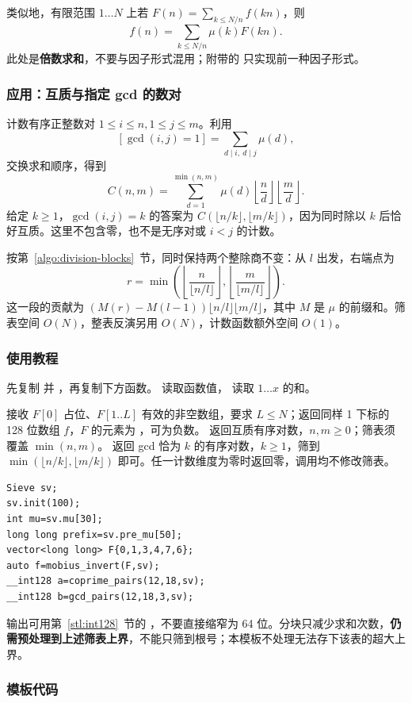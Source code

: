 类似地，有限范围 $1\ldots N$ 上若 $F(n)=\sum_{k\leq N/n}f(kn)$，则
\[
    f(n)=\sum_{k\leq N/n}\mu(k)F(kn).
\]
此处是\textbf{倍数求和}，不要与因子形式混用；附带的  只实现前一种因子形式。

\subsubsection*{应用：互质与指定 gcd 的数对}
计数有序正整数对 $1\leq i\leq n,1\leq j\leq m$。利用
\[
    [\gcd(i,j)=1]=\sum_{d\mid i,\ d\mid j}\mu(d),
\]
交换求和顺序，得到
\[
    C(n,m)=\sum_{d=1}^{\min(n,m)}\mu(d)
    \left\lfloor\frac nd\right\rfloor\left\lfloor\frac md\right\rfloor.
\]
给定 $k\geq1$，$\gcd(i,j)=k$ 的答案为 $C(\lfloor n/k\rfloor,\lfloor m/k\rfloor)$，因为同时除以 $k$ 后恰好互质。这里不包含零，也不是无序对或 $i<j$ 的计数。

按第~\ref{algo:division-blocks}~节，同时保持两个整除商不变：从 $l$ 出发，右端点为
\[
    r=\min\left(\left\lfloor\frac{n}{\lfloor n/l\rfloor}\right\rfloor,
                \left\lfloor\frac{m}{\lfloor m/l\rfloor}\right\rfloor\right).
\]
这一段的贡献为 $(M(r)-M(l-1))\lfloor n/l\rfloor\lfloor m/l\rfloor$，其中 $M$ 是 $\mu$ 的前缀和。筛表空间 $O(N)$，整表反演另用 $O(N)$，计数函数额外空间 $O(1)$。

\subsubsection*{使用教程}
先复制  并 ，再复制下方函数。 读取函数值， 读取 $1\ldots x$ 的和。

 接收 $F[0]$ 占位、$F[1..L]$ 有效的非空数组，要求 $L\leq N$；返回同样 1 下标的 128 位数组 $f$，$F$ 的元素为 ，可为负数。 返回互质有序对数，$n,m\geq0$；筛表须覆盖 $\min(n,m)$。 返回 gcd 恰为 $k$ 的有序对数，$k\geq1$，筛到 $\min(\lfloor n/k\rfloor,\lfloor m/k\rfloor)$ 即可。任一计数维度为零时返回零，调用均不修改筛表。
\begin{lstlisting}[style=mtycpp,numbers=none]
Sieve sv;
sv.init(100);
int mu=sv.mu[30];
long long prefix=sv.pre_mu[50];
vector<long long> F{0,1,3,4,7,6};
auto f=mobius_invert(F,sv);
__int128 a=coprime_pairs(12,18,sv);
__int128 b=gcd_pairs(12,18,3,sv);
\end{lstlisting}

输出可用第~\ref{stl:int128}~节的 ，不要直接缩窄为 64 位。分块只减少求和次数，\textbf{仍需预处理到上述筛表上界}，不能只筛到根号；本模板不处理无法存下该表的超大上界。

\subsubsection*{模板代码}
